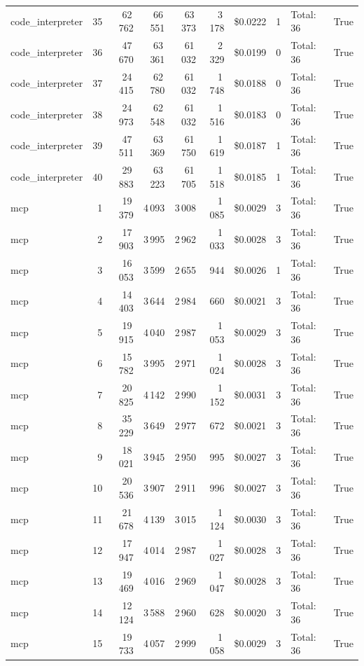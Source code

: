 \documentclass[a4paper,11pt]{article}
\begin{document}
\begin{table}[H]
{\begin{tabular}{l r r r r r r r l r}
code\_interpreter & 35 & 62\,762 & 66\,551 & 63\,373 & 3\,178 & \$0.0222 & 1 & Total: 36 & True \\
code\_interpreter & 36 & 47\,670 & 63\,361 & 61\,032 & 2\,329 & \$0.0199 & 0 & Total: 36 & True \\
code\_interpreter & 37 & 24\,415 & 62\,780 & 61\,032 & 1\,748 & \$0.0188 & 0 & Total: 36 & True \\
code\_interpreter & 38 & 24\,973 & 62\,548 & 61\,032 & 1\,516 & \$0.0183 & 0 & Total: 36 & True \\
code\_interpreter & 39 & 47\,511 & 63\,369 & 61\,750 & 1\,619 & \$0.0187 & 1 & Total: 36 & True \\
code\_interpreter & 40 & 29\,883 & 63\,223 & 61\,705 & 1\,518 & \$0.0185 & 1 & Total: 36 & True \\
\midrule
mcp & 1 & 19\,379 & 4\,093 & 3\,008 & 1\,085 & \$0.0029 & 3 & Total: 36 & True \\
mcp & 2 & 17\,903 & 3\,995 & 2\,962 & 1\,033 & \$0.0028 & 3 & Total: 36 & True \\
mcp & 3 & 16\,053 & 3\,599 & 2\,655 & 944 & \$0.0026 & 1 & Total: 36 & True \\
mcp & 4 & 14\,403 & 3\,644 & 2\,984 & 660 & \$0.0021 & 3 & Total: 36 & True \\
mcp & 5 & 19\,915 & 4\,040 & 2\,987 & 1\,053 & \$0.0029 & 3 & Total: 36 & True \\
mcp & 6 & 15\,782 & 3\,995 & 2\,971 & 1\,024 & \$0.0028 & 3 & Total: 36 & True \\
mcp & 7 & 20\,825 & 4\,142 & 2\,990 & 1\,152 & \$0.0031 & 3 & Total: 36 & True \\
mcp & 8 & 35\,229 & 3\,649 & 2\,977 & 672 & \$0.0021 & 3 & Total: 36 & True \\
mcp & 9 & 18\,021 & 3\,945 & 2\,950 & 995 & \$0.0027 & 3 & Total: 36 & True \\
mcp & 10 & 20\,536 & 3\,907 & 2\,911 & 996 & \$0.0027 & 3 & Total: 36 & True \\
mcp & 11 & 21\,678 & 4\,139 & 3\,015 & 1\,124 & \$0.0030 & 3 & Total: 36 & True \\
mcp & 12 & 17\,947 & 4\,014 & 2\,987 & 1\,027 & \$0.0028 & 3 & Total: 36 & True \\
mcp & 13 & 19\,469 & 4\,016 & 2\,969 & 1\,047 & \$0.0028 & 3 & Total: 36 & True \\
mcp & 14 & 12\,124 & 3\,588 & 2\,960 & 628 & \$0.0020 & 3 & Total: 36 & True \\
mcp & 15 & 19\,733 & 4\,057 & 2\,999 & 1\,058 & \$0.0029 & 3 & Total: 36 & True \\

\end{tabular}}
\end{table}
\end{document}
